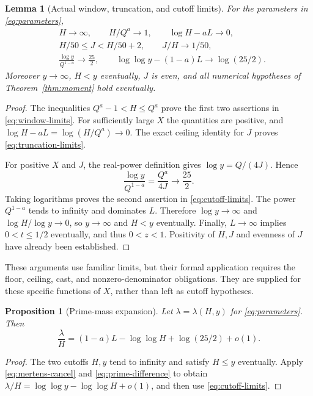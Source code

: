 \documentclass[11pt,a4paper]{article}
\newtheorem{lemma}[theorem]{Lemma}
\newtheorem{proposition}[theorem]{Proposition}
\theoremstyle{definition}
\theoremstyle{remark}
\numberwithin{equation}{section}
\begin{document}
\begin{lemma}[Actual window, truncation, and cutoff limits]\label{lem:parameters}
For the parameters in \eqref{eq:parameters},
\begin{align}
 &H\to\infty,\qquad H/Q^a\to1,\qquad\log H-aL\to0,\label{eq:window-limits}\\
 &H/50\le J<H/50+2,\qquad J/H\to1/50,\label{eq:truncation-limits}\\
 &\frac{\log y}{Q^{1-a}}\to\frac{25}{2},\qquad
   \log\log y-(1-a)L\to\log(25/2).\label{eq:cutoff-limits}
\end{align}
Moreover $y\to\infty$, $H<y$ eventually, $J$ is even, and all numerical
hypotheses of Theorem~\ref{thm:moment} hold eventually.
\end{lemma}
\begin{proof}
The inequalities $Q^a-1<H\le Q^a$ prove the first two assertions in
\eqref{eq:window-limits}. For sufficiently large $X$ the quantities are
positive, and
$\log H-aL=\log(H/Q^a)\to0$.
The exact ceiling identity for $J$ proves \eqref{eq:truncation-limits}.

For positive $X$ and $J$, the real-power definition gives
$\log y=Q/(4J)$. Hence
\[
 \frac{\log y}{Q^{1-a}}=\frac{Q^a}{4J}\longrightarrow\frac{25}{2}.
\]
Taking logarithms proves the second assertion in \eqref{eq:cutoff-limits}.
The power $Q^{1-a}$ tends to infinity and dominates $L$. Therefore
$\log y\to\infty$ and $\log H/\log y\to0$, so $y\to\infty$ and $H<y$
eventually. Finally, $L\to\infty$ implies $0<t\le1/2$ eventually, and thus
$0<z<1$. Positivity of $H,J$ and evenness of $J$ have already been established.
\end{proof}
These arguments use familiar limits, but their formal application requires the
floor, ceiling, cast, and nonzero-denominator obligations. They are supplied
for these specific functions of $X$, rather than left as cutoff hypotheses.

\begin{proposition}[Prime-mass expansion]\label{prop:mass}
Let $\lambda=\lambda(H,y)$ for \eqref{eq:parameters}. Then
\begin{equation}\label{eq:mass-expansion}
 \frac{\lambda}{H}
 = (1-a)L-\log\log H+\log(25/2)+o(1).
\end{equation}
\end{proposition}
\begin{proof}
The two cutoffs $H,y$ tend to infinity and satisfy $H\le y$ eventually.
Apply \eqref{eq:mertens-cancel} and \eqref{eq:prime-difference} to obtain
$\lambda/H=\log\log y-\log\log H+o(1)$, and then use
\eqref{eq:cutoff-limits}.
\end{proof}
\end{document}
